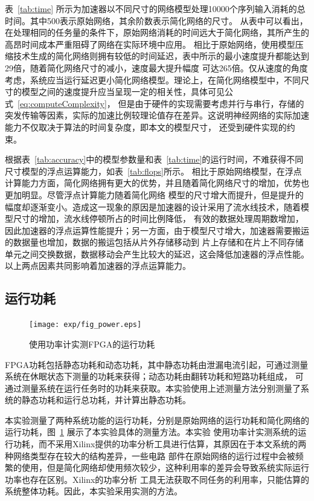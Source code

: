 表~\ref{tab:time} 所示为加速器以不同尺寸的网络模型处理10000个序列输入消耗的总时间。其中500表示原始网络，其余阶数表示简化网络的尺寸。
从表中可以看出，在处理相同的任务量的条件下，原始网络消耗的时间远大于简化网络，其所产生的高昂时间成本严重阻碍了网络在实际环境中应用。
相比于原始网络，使用模型压缩技术生成的简化网络则拥有较低的时间延迟，表中所示的最小速度提升都能达到29倍，随着简化网络尺寸的减小，速度最大提升幅度
可达265倍。仅从速度的角度考虑，系统应当运行延迟更小简化网络模型。理论上，在简化网络模型中，不同尺寸的模型之间的速度提升应当呈现一定的相关性，具体可见公式~\ref{eq:computeComplexity}，
但是由于硬件的实现需要考虑并行与串行，存储的突发传输等因素，实际的加速比例较理论值存在差异。这说明神经网络的实际加速能力不仅取决于算法的时间复杂度，即本文的模型尺寸，
还受到硬件实现的约束。



根据表~\ref{tab:accuracy}中的模型参数量和表~\ref{tab:time}的运行时间，不难获得不同尺寸模型的浮点运算能力，如表~\ref{tab:flops}所示。
相比于原始网络模型，在浮点计算能力方面，简化网络拥有更大的优势，并且随着简化网络尺寸的增加，优势也更加明显。尽管浮点计算能力随着简化网络
模型的尺寸增大而提升，但是提升的幅度却逐渐变小。造成这一现象的原因是加速器的设计采用了流水线技术，随着模型尺寸的增加，流水线停顿所占的时间比例降低，
有效的数据处理周期数增加，因此加速器的浮点运算性能提升；另一方面，由于模型尺寸增大，加速器需要搬运的数据量也增加，数据的搬运包括从片外存储移动到
片上存储和在片上不同存储单元之间交换数据，数据移动会产生比较大的延迟，这会降低加速器的浮点性能。以上两点因素共同影响着加速器的浮点运算能力。

\subsection{运行功耗}

\begin{figure}
	\centering
	\texttt{[image: exp/fig\_power.eps]}
	\caption{使用功率计实测FPGA的运行功耗}
	\label{fig:power}
\end{figure}



FPGA功耗包括静态功耗和动态功耗，其中静态功耗由泄漏电流引起，可通过测量系统在休眠状态下测量的功耗来获得；动态功耗由翻转功耗和短路功耗组成，
可通过测量系统在运行任务时的功耗来获取。本实验使用上述测量方法分别测量了系统的静态功耗和运行总功耗，并计算出静态功耗。

本实验测量了两种系统功能的运行功耗，分别是原始网络的运行功耗和简化网络的运行功耗，图~\ref{fig:power} 展示了本实验具体的测量方法。本实验
使用功率计实测系统的运行功耗，而不采用Xilinx提供的功率分析工具进行估算，其原因在于本文系统的两种网络类型存在较大的结构差异，一些电路
部件在原始网络的运行过程中会被频繁的使用，但是简化网络却使用频次较少，这种利用率的差异会导致系统实际运行功率也存在区别。Xilinx的功率分析
工具无法获取不同任务的利用率，只能估算的系统整体功耗。因此，本实验采用实测的方法。

